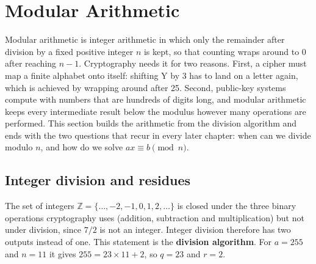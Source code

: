 \section{Modular Arithmetic}\label{sec:modular}

Modular arithmetic is integer arithmetic in which only the remainder after division by a fixed positive integer $n$ is kept, so that counting wraps around to 0 after reaching $n - 1$. Cryptography needs it for two reasons. First, a cipher must map a finite alphabet onto itself: shifting Y by 3 has to land on a letter again, which is achieved by wrapping around after 25. Second, public-key systems compute with numbers that are hundreds of digits long, and modular arithmetic keeps every intermediate result below the modulus however many operations are performed. This section builds the arithmetic from the division algorithm and ends with the two questions that recur in every later chapter: when can we divide modulo $n$, and how do we solve $ax \equiv b \pmod n$.

\subsection{Integer division and residues}
The set of integers $\mathbb{Z} = \{\dots, -2, -1, 0, 1, 2, \dots\}$ is closed under the three binary operations cryptography uses (addition, subtraction and multiplication) but not under division, since $7/2$ is not an integer. Integer division therefore has two outputs instead of one.  This statement is the \textbf{division algorithm}. For $a = 255$ and $n = 11$ it gives $255 = 23 \times 11 + 2$, so $q = 23$ and $r = 2$.

